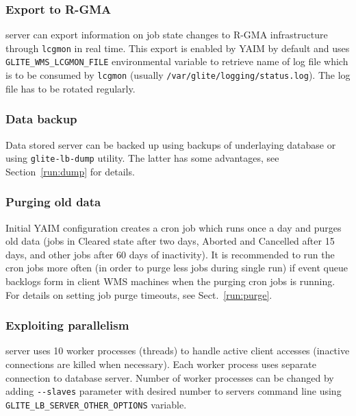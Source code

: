 

\subsubsection{Export to R-GMA}

{\sloppy
\LB server can export information on job state changes to R-GMA infrastructure through \verb'lcgmon' 
in real time. This export is enabled by YAIM by default and uses \verb'GLITE_WMS_LCGMON_FILE' 
environmental variable to retrieve name of log file which is to be consumed by \verb'lcgmon' (usually
\verb'/var/glite/logging/status.log'). The log file has to be rotated regularly.

}

\subsubsection{Data backup}
\label{inst:backup}

Data stored \LB server can be backed up using backups of underlaying database or using \verb'glite-lb-dump' utility.
The latter has some advantages, see Section~\ref{run:dump} for details.

\subsubsection{Purging old data}
\label{inst:purge}

Initial YAIM configuration creates a cron job which runs once a day and purges old 
data (jobs in Cleared state after two days, Aborted and Cancelled after 15 days, and other jobs 
after 60 days of inactivity). It is recommended to run the cron jobs more often (in order to purge less jobs
during single run) if event queue backlogs form in client WMS machines when the purging cron jobs is running.
For details on setting job purge timeouts, see Sect.~\ref{run:purge}.


\subsubsection{Exploiting parallelism}

\LB server uses 10 worker processes (threads) to handle active client accesses (inactive connections are killed
when necessary). Each worker process uses separate connection to database server. Number of worker processes 
can be changed by adding \verb'--slaves' parameter with desired number to servers command line
using \verb'GLITE_LB_SERVER_OTHER_OPTIONS' variable.

